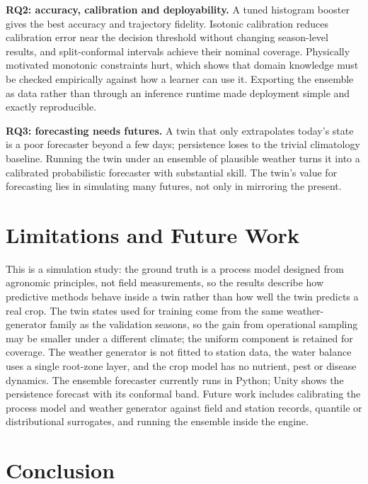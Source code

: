\documentclass[conference]{IEEEtran}
\begin{document}
\textbf{RQ2: accuracy, calibration and deployability.} A tuned histogram booster gives the best
accuracy and trajectory fidelity. Isotonic calibration reduces calibration error near the
decision threshold without changing season-level results, and split-conformal intervals achieve
their nominal coverage. Physically motivated monotonic constraints hurt, which shows
that domain knowledge must be checked empirically against how a learner can use it. Exporting
the ensemble as data rather than through an inference runtime made deployment simple and
exactly reproducible.

\textbf{RQ3: forecasting needs futures.} A twin that only extrapolates today's state is a poor
forecaster beyond a few days; persistence loses to the trivial climatology baseline. Running the
twin under an ensemble of plausible weather turns it into a calibrated probabilistic forecaster
with substantial skill. The twin's value for forecasting lies in simulating many futures,
not only in mirroring the present.

\section{Limitations and Future Work}

This is a simulation study: the ground truth is a process model designed from agronomic
principles, not field measurements, so the results describe how predictive methods behave
inside a twin rather than how well the twin predicts a real crop. The twin states used for
training come from the same weather-generator family as the validation seasons, so the gain from
operational sampling may be smaller under a different climate; the uniform component is retained
for coverage. The weather generator is not fitted to station data, the water balance uses a
single root-zone layer, and the crop model has no nutrient, pest or disease dynamics. The
ensemble forecaster currently runs in Python; Unity shows the persistence forecast with its
conformal band. Future work includes calibrating the process model and weather generator
against field and station records, quantile or distributional surrogates, and running the
ensemble inside the engine.

\section{Conclusion}
\end{document}
